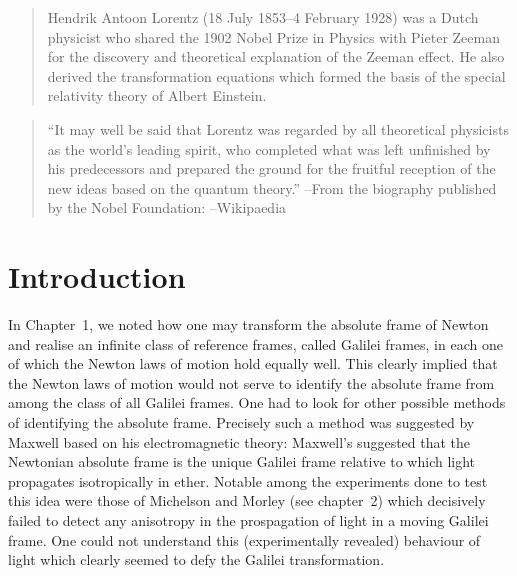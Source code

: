 \begin{small}
\begin{quote}

Hendrik Antoon Lorentz (18 July 1853--4 February 1928) was a 
Dutch physicist who shared the 1902 Nobel Prize in Physics 
with Pieter Zeeman for the discovery and theoretical 
explanation of the Zeeman effect. He also derived the 
transformation equations which formed the basis of the 
special relativity theory of Albert Einstein.
\end{quote}

\begin{quote}
``It may well be said that Lorentz was regarded by all 
theoretical physicists as the world's leading spirit, who 
completed what was left unfinished by his predecessors and 
prepared the ground for the fruitful reception of the new 
ideas based on the quantum theory.'' --From the biography 
published by the Nobel Foundation: \dm \hfill --Wikipaedia
\end{quote}

\newpage

\section{Introduction}
In Chapter~1, we noted how one may transform the 
absolute frame of Newton and realise an infinite class of 
reference frames, called Galilei frames, in each one of 
which the Newton laws of motion hold equally well. This 
clearly implied that the Newton laws of motion would not 
serve to identify the absolute frame from among the class 
of all Galilei frames. One had to look for other possible 
methods of identifying the absolute frame. Precisely such a 
method was suggested by Maxwell based on his electromagnetic 
theory: Maxwell's suggested that the Newtonian absolute 
frame is the unique Galilei frame relative to which light 
propagates isotropically in ether. Notable among the 
experiments done to test this idea were those of Michelson 
and Morley (see chapter~2) which decisively failed to detect 
any anisotropy in the prospagation of light in a moving 
Galilei frame. One could not understand this (experimentally 
revealed) behaviour of light which clearly seemed to defy 
the Galilei transformation.


\end{small}

